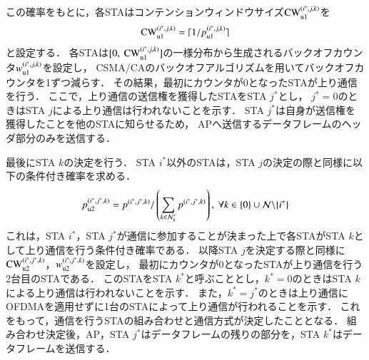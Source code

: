 \documentclass[master]{kuisthesis}		%
\newcommand{\mthnk}{{\mathcal N}'_k}
\begin{document}
			この確率をもとに，各STAはコンテンションウィンドウサイズ${\rm CW}^{(i^*,j,k)}_{\rm u1}$を
			\begin{equation}
				{\rm CW}^{(i^*,j,k)}_{\rm u1} = \lceil 1/p_{\rm u1}^{(i^*,j,k)} \rceil
			\end{equation}
			と設定する．
			各STAは$[0,\ {\rm CW}^{(i^*,j,k)}_{\rm u1}]$の一様分布から生成されるバックオフカウンタ$w_{\rm u1}^{(i^*,j,k)}$を設定し，
			CSMA/CAのバックオフアルゴリズムを用いてバックオフカウンタを1ずつ減らす．
			その結果，最初にカウンタが0となったSTAが上り通信を行う．
			ここで，上り通信の送信権を獲得したSTAをSTA $j^*$とし，
			$j^*=0$のときはSTA $j$による上り通信は行われないことを示す．
			STA $j^*$は自身が送信権を獲得したことを他のSTAに知らせるため，
			APへ送信するデータフレームのヘッダ部分のみを送信する．
			\par
			最後にSTA $k$の決定を行う．
			STA $i^*$以外のSTAは，STA $j$の決定の際と同様に以下の条件付き確率を求める．
			\begin{align}
				p_{\rm u2}^{(i^*,j^*,k)}=p^{(i^*,j^*,k)} / \left(\sum_{k\in\mthnk} p^{(i^*,j^*,k)}\right),\ \forall k \in \{0\}\cup{\mathcal N}\backslash \{i^*\}
			\end{align}
			これは，STA $i^*$，STA $j^*$が通信に参加することが決まった上で各STAがSTA $k$として上り通信を行う条件付き確率である．
			以降STA $j$を決定する際と同様に${\rm CW}^{(i^*,j^*,k)}_{\rm u2}$，$w_{\rm u2}^{(i^*,j^*,k)}$を設定し，
			最初にカウンタが0となったSTAが上り通信を行う2台目のSTAである．
			このSTAをSTA $k^*$と呼ぶこととし，$k^*=0$のときはSTA $k$による上り通信は行われないことを示す．
			また，$k^*=j^*$のときは上り通信にOFDMAを適用せずに1台のSTAによって上り通信が行われることを示す．
			これをもって，通信を行うSTAの組み合わせと通信方式が決定したこととなる．
			組み合わせ決定後，AP，STA $j^*$はデータフレームの残りの部分を，STA $k^*$はデータフレームを送信する．
\end{document}
